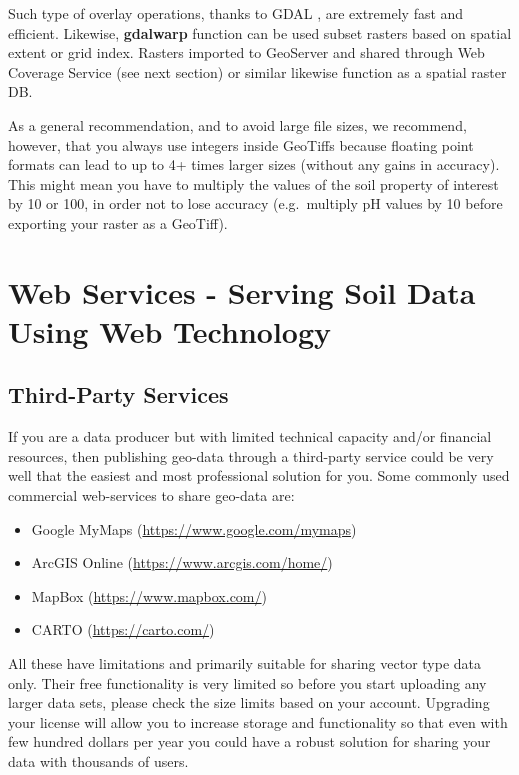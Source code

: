 \documentclass[10pt,b5paper,]{book}
\providecommand{\tightlist}{%
  \setlength{\itemsep}{0pt}\setlength{\parskip}{0pt}}
\theoremstyle{definition}
\theoremstyle{definition}
\theoremstyle{definition}
\theoremstyle{remark}
\begin{document}
Such type of overlay operations, thanks to GDAL
\citep{warmerdam_geospatial_2008}, are extremely fast and efficient.
Likewise, \textbf{gdalwarp} function can be used subset rasters based on
spatial extent or grid index. Rasters imported to GeoServer and shared
through Web Coverage Service (see next section) or similar likewise
function as a spatial raster DB.

As a general recommendation, and to avoid large file sizes, we
recommend, however, that you always use integers inside GeoTiffs because
floating point formats can lead to up to 4+ times larger sizes (without
any gains in accuracy). This might mean you have to multiply the values
of the soil property of interest by 10 or 100, in order not to lose
accuracy (e.g.~multiply pH values by 10 before exporting your raster as
a GeoTiff).

\hypertarget{web-services---serving-soil-data-using-web-technology}{%
\section{Web Services - Serving Soil Data Using Web
Technology}\label{web-services---serving-soil-data-using-web-technology}}

\hypertarget{third-party-services}{%
\subsection{Third-Party Services}\label{third-party-services}}

If you are a data producer but with limited technical capacity and/or
financial resources, then publishing geo-data through a third-party
service could be very well that the easiest and most professional
solution for you. Some commonly used commercial web-services to share
geo-data are:

\begin{itemize}
\tightlist
\item
  Google MyMaps (\url{https://www.google.com/mymaps})
\item
  ArcGIS Online (\url{https://www.arcgis.com/home/})
\item
  MapBox (\url{https://www.mapbox.com/})
\item
  CARTO (\url{https://carto.com/})
\end{itemize}

All these have limitations and primarily suitable for sharing vector
type data only. Their free functionality is very limited so before you
start uploading any larger data sets, please check the size limits based
on your account. Upgrading your license will allow you to increase
storage and functionality so that even with few hundred dollars per year
you could have a robust solution for sharing your data with thousands of
users.
\end{document}
